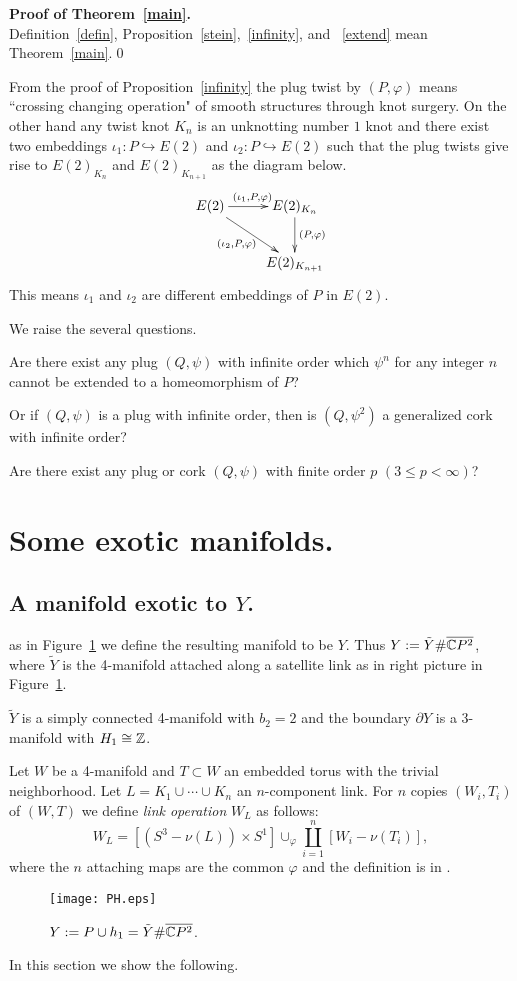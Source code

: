 \documentclass[11pt]{amsart}
\begin{document}
{\bf Proof of Theorem~\ref{main}.}\\
Definition~\ref{defin}, Proposition~\ref{stein},~\ref{infinity}, and ~\ref{extend} mean Theorem~\ref{main}.\qed
\medskip

From the proof of Proposition~\ref{infinity}
the plug twist by $(P,\varphi)$ means ``crossing changing operation" of smooth structures through knot surgery.
On the other hand any twist knot $K_n$ is an unknotting number $1$ knot and there exist two embeddings $\iota_1:P\hookrightarrow E(2)$
and $\iota_2:P\hookrightarrow E(2)$ such that the plug twists give rise to $E(2)_{K_n}$ and $E(2)_{K_{n+1}}$ as
the diagram below.
$$
\xymatrix{
E(2) \ar@{->}[r]^{(\iota_1,P,\varphi)}\ar@{->}[dr]_{(\iota_2,P,\varphi)}  &  E(2)_{K_n}\ar@{->}[d]^{(P,\varphi)}\\
 & E(2)_{K_{n+1}}\\
}
$$
This means $\iota_1$ and $\iota_2$ are different embeddings of $P$ in $E(2)$.

We raise the several questions.
\begin{que}
Are there exist any plug $(Q,\psi)$ with infinite order which $\psi^n$ for any integer $n$ cannot be extended to a homeomorphism of $P$?

Or if $(Q,\psi)$ is a plug with infinite order, then is $(Q,\psi^2)$ a generalized cork with infinite order?
\end{que}

\begin{que}
Are there exist any plug or cork $(Q,\psi)$ with finite order $p$ $(3\le p<\infty)$?
\end{que}
\section{Some exotic manifolds.}
\subsection{A manifold exotic to $Y$.}
as in Figure~\ref{PH} we define the resulting manifold to be $Y$.
Thus $Y:=\tilde{Y}\#\overline{{\Bbb C}P^2}$, where
$\tilde{Y}$ is the 4-manifold attached along a satellite link as in right picture in Figure~\ref{PH}.

$\tilde{Y}$ is a simply connected 4-manifold with $b_2=2$ and
the boundary $\partial Y$ is a 3-manifold with $H_1\cong {\Bbb Z}$.

Let $W$ be a 4-manifold and $T\subset W$ an embedded torus with the trivial neighborhood.
Let $L=K_1\cup\cdots\cup K_n$ an $n$-component link.
For $n$ copies $(W_i,T_i)$ of $(W,T)$ we define {\it link operation} $W_L$ as follows:
$$W_L=[(S^3-\nu(L))\times S^1]\cup_{\varphi}\coprod_{i=1}^n[W_i-\nu(T_i)],$$
where the $n$ attaching maps are the common $\varphi$ and the definition is in \cite{[FS]}.
\begin{figure}[htbp]
\begin{center}
\texttt{[image: PH.eps]}
\caption{$Y:=P\cup h_1=\tilde{Y}\#\overline{{\Bbb C}P^2}$.}
\label{PH}
\end{center}
\end{figure}
In this section we show the following.
\end{document}
